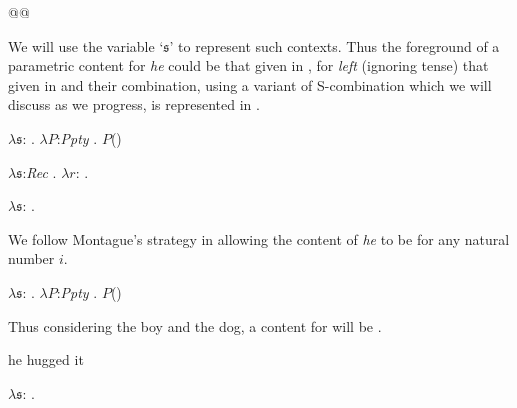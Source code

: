 @@

We will use the variable
`$\mathfrak{s}$' to represent such contexts.  Thus the foreground of a parametric content for
\textit{he} could be that given in , for \textit{left}
(ignoring tense) that given in  and their combination, using a variant
of S-combination which we will discuss as we progress, is represented
in .
\begin{ex} 
\begin{subex} 
 
\item $\lambda\mathfrak{s}$: . 
        $\lambda P$:\textit{Ppty} . $P$()
 
\item $\lambda\mathfrak{s}$:\textit{Rec} . 
        $\lambda r$: . 

\item $\lambda\mathfrak{s}$:
  . 
 
\end{subex} 
   
\end{ex}
We follow Montague's strategy in allowing the content of \textit{he}
to be \nexteg{} for any natural number $i$.
\begin{ex}
$\lambda\mathfrak{s}$: . 
        $\lambda P$:\textit{Ppty}
        . $P$()
\label{ex:pronoun-cont}
\end{ex} 
Thus considering the boy and the dog, a
content for  will be .
\begin{ex} 
\begin{subex} 
 
\item he hugged it 
 
\item $\lambda\mathfrak{s}$:
                                 . 
 
\end{subex} 
   
\end{ex} 
